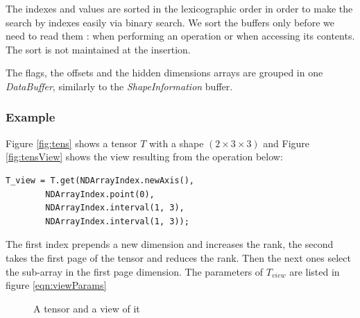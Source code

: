 		The indexes and values are sorted in the lexicographic order in order to make the search by indexes easily via binary search. We sort the buffers only before we need to read them : when performing an operation or when accessing its contents. The sort is not maintained at the insertion.
		
		The flags, the offsets and the hidden dimensions arrays are grouped in one \textit{DataBuffer}, similarly to the \textit{ShapeInformation} buffer.
		
\subsubsection{Example}
Figure \ref{fig:tens} shows a tensor $T$ with a shape $(2\times 3\times 3)$ and Figure \ref{fig:tensView} shows the view resulting from the operation below:

\begin{lstlisting}[style=nonumbers]
	T_view = T.get(NDArrayIndex.newAxis(), 
		NDArrayIndex.point(0),
		NDArrayIndex.interval(1, 3), 
		NDArrayIndex.interval(1, 3));
\end{lstlisting}

The first index prepends a new dimension and increases the rank, the second takes the first page of the tensor and reduces the rank. Then the next ones select the sub-array in the first page dimension. The parameters of $T_{view}$ are listed in figure \ref{eqn:viewParams} 

\begin{figure}[!h]
	\centering
	\qquad
	\qquad


	\caption{A tensor and a view of it }
	\label{fig:example}
\end{figure}
	
